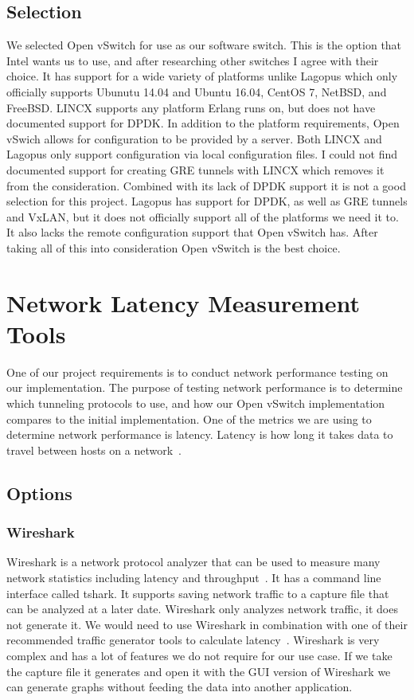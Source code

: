 \documentclass[10pt,letterpaper,onecolumn,journal]{IEEEtran}
\begin{document}
\subsection{Selection}
We selected Open vSwitch for use as our software switch. 
This is the option that Intel wants us to use, and after researching other switches I agree with their choice.
It has support for a wide variety of platforms unlike Lagopus which only officially supports Ubunutu 14.04 and Ubuntu 16.04, CentOS 7, NetBSD, and FreeBSD.
LINCX supports any platform Erlang runs on, but does not have documented support for DPDK.
In addition to the platform requirements, Open vSwich allows for configuration to be provided by a server.
Both LINCX and Lagopus only support configuration via local configuration files.
I could not find documented support for creating GRE tunnels with LINCX which removes it from the consideration.
Combined with its lack of DPDK support it is not a good selection for this project.
Lagopus has support for DPDK, as well as GRE tunnels and VxLAN, but it does not officially support all of the platforms we need it to. 
It also lacks the remote configuration support that Open vSwitch has.
After taking all of this into consideration Open vSwitch is the best choice.


\section{Network Latency Measurement Tools}
One of our project requirements is to conduct network performance testing on our implementation.
The purpose of testing network performance is to determine which tunneling protocols to use, 
and how our Open vSwitch implementation compares to the initial implementation.
One of the metrics we are using to determine network performance is latency.
Latency is how long it takes data to travel between hosts on a network~\cite{topdown-ssl}.

\subsection{Options}
\subsubsection{Wireshark}
Wireshark is a network protocol analyzer that can be used to measure many network statistics including latency and throughput~\cite{wireshark}. 
It has a command line interface called tshark.
It supports saving network traffic to a capture file that can be analyzed at a later date.
Wireshark only analyzes network traffic, it does not generate it.
We would need to use Wireshark in combination with one of their recommended traffic generator tools to calculate latency~\cite{wireshark-tools}.
Wireshark is very complex and has a lot of features we do not require for our use case.
If we take the capture file it generates and open it with the GUI version of Wireshark we can generate graphs without feeding the data into another application.
\end{document}
